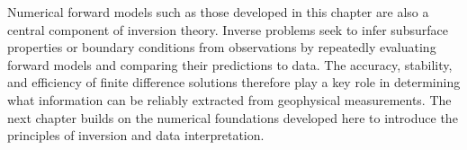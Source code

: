 Numerical forward models such as those developed in this chapter are also a central component of inversion theory. Inverse problems seek to infer subsurface properties or boundary conditions from observations by repeatedly evaluating forward models and comparing their predictions to data. The accuracy, stability, and efficiency of finite difference solutions therefore play a key role in determining what information can be reliably extracted from geophysical measurements. The next chapter builds on the numerical foundations developed here to introduce the principles of inversion and data interpretation.
